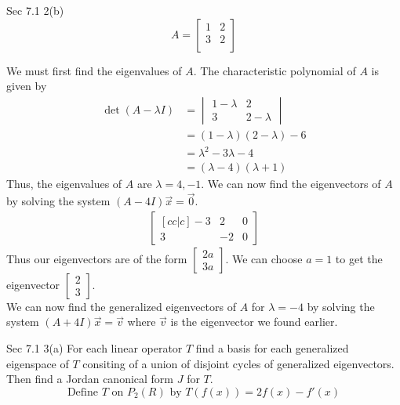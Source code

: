 \documentclass[answers,12pt,addpoints]{exam}
\begin{document}
\begin{questions}
\begin{solution}
    \end{solution}
    \question Sec 7.1 2(b)
    $$A = \begin{bmatrix}
        1 & 2\\
        3 & 2\\
    \end{bmatrix}$$
    \begin{solution}
        We must first find the eigenvalues of $A$. The characteristic polynomial of $A$ is given by
        \begin{align*}
            \det(A - \lambda I) &= \begin{vmatrix}
                1 - \lambda & 2 \\
                3 & 2 - \lambda
            \end{vmatrix} \\
            &= (1 - \lambda)(2 - \lambda) - 6 \\
            &= \lambda^2 - 3\lambda - 4 \\
            &= (\lambda - 4)(\lambda + 1)
        \end{align*}
        Thus, the eigenvalues of $A$ are $\lambda = 4, -1$. We can now find the eigenvectors of $A$ by solving the system $(A - 4I)\vec{x} = \vec{0}$.
        \begin{align*}
            \begin{bmatrix}[cc|c]
                -3 & 2 & 0 \\
                3 & -2 & 0
            \end{bmatrix}
        \end{align*}
        Thus our eigenvectors are of the form $\begin{bmatrix} 2a\\ 3a \end{bmatrix}$. We can choose $a = 1$ to get the eigenvector $\begin{bmatrix} 2\\ 3 \end{bmatrix}$. \\
        We can now find the generalized eigenvectors of $A$ for $\lambda = -4$ by solving the system $(A + 4I)\vec{x} = \vec{v}$ where $\vec{v}$ is the eigenvector we found earlier. 


    \end{solution}

    \question Sec 7.1 3(a)
    For each linear operator $T$ find a basis for each generalized eigenspace of $T$ consiting of a union of disjoint cycles of generalized eigenvectors. Then find a Jordan canonical form $J$ for $T$.
    $$ \text{Define } T \text{ on } P_2(R) \text{ by } T(f(x)) = 2f(x) - f'(x)$$
    \begin{solution}
        

\end{solution}
\end{questions}
\end{document}

